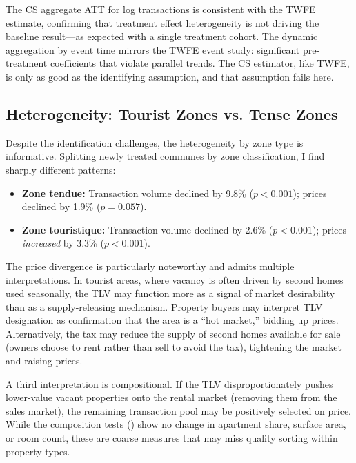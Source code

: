 \documentclass[12pt]{article}
\begin{document}
The CS aggregate ATT for log transactions is consistent with the TWFE estimate, confirming that treatment effect heterogeneity is not driving the baseline result---as expected with a single treatment cohort. The dynamic aggregation by event time mirrors the TWFE event study: significant pre-treatment coefficients that violate parallel trends. The CS estimator, like TWFE, is only as good as the identifying assumption, and that assumption fails here.

\subsection{Heterogeneity: Tourist Zones vs. Tense Zones}

Despite the identification challenges, the heterogeneity by zone type is informative. Splitting newly treated communes by zone classification, I find sharply different patterns:

\begin{itemize}
\item \textbf{Zone tendue:} Transaction volume declined by 9.8\% ($p < 0.001$); prices declined by 1.9\% ($p = 0.057$).
\item \textbf{Zone touristique:} Transaction volume declined by 2.6\% ($p < 0.001$); prices \textit{increased} by 3.3\% ($p < 0.001$).
\end{itemize}

The price divergence is particularly noteworthy and admits multiple interpretations. In tourist areas, where vacancy is often driven by second homes used seasonally, the TLV may function more as a signal of market desirability than as a supply-releasing mechanism. Property buyers may interpret TLV designation as confirmation that the area is a ``hot market,'' bidding up prices. Alternatively, the tax may reduce the supply of second homes available for sale (owners choose to rent rather than sell to avoid the tax), tightening the market and raising prices.

A third interpretation is compositional. If the TLV disproportionately pushes lower-value vacant properties onto the rental market (removing them from the sales market), the remaining transaction pool may be positively selected on price. While the composition tests () show no change in apartment share, surface area, or room count, these are coarse measures that may miss quality sorting within property types.
\end{document}
